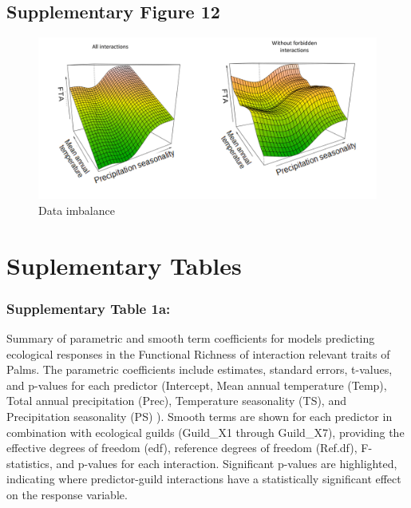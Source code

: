 \documentclass[
]{agujournal2019}
\begin{document}
\subsection{Supplementary Figure 12}

\begin{figure}[H]

{\centering \includegraphics[width=5.67708in,height=\textheight,keepaspectratio]{sup_figures/fta_surface_both.jpg}

}

\caption{Data imbalance}

\end{figure}%

\section{Suplementary Tables}\label{suplementary-tables}

\subsubsection{Supplementary Table 1a:}\label{supplementary-table-1a}

Summary of parametric and smooth term coefficients for models predicting
ecological responses in the Functional Richness of interaction relevant
traits of Palms. The parametric coefficients include estimates, standard
errors, t-values, and p-values for each predictor (Intercept, Mean
annual temperature (Temp), Total annual precipitation (Prec),
Temperature seasonality (TS), and Precipitation seasonality (PS) ).
Smooth terms are shown for each predictor in combination with ecological
guilds (Guild\_X1 through Guild\_X7), providing the effective degrees of
freedom (edf), reference degrees of freedom (Ref.df), F-statistics, and
p-values for each interaction. Significant p-values are highlighted,
indicating where predictor-guild interactions have a statistically
significant effect on the response variable.
\end{document}
